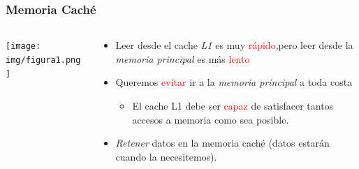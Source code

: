 \documentclass{beamer}
\begin{document}
{
\frametitle{Memoria Caché}
\begin{columns}
	\begin{column}{0.4\textwidth}
		\texttt{[image: img/figura1.png]}
	\end{column}
	\begin{column}{0.6\textwidth}
		\begin{itemize}
			\item<1->Leer desde el cache \emph{L1} es muy \textcolor{red}{rápido},pero leer desde la \emph{memoria principal} es más \textcolor{red}{lento}
			\item<2->Queremos \textcolor{red}{evitar} ir a la \emph{memoria principal} a toda costa
			\begin{itemize}
				\item<3->El cache L1 debe ser \textcolor{red}{capaz} de satisfacer tantos accesos a memoria como sea posible.
			\end{itemize}
			\item<4->\emph{Retener} datos en la memoria caché (datos estarán cuando la necesitemos).
		\end{itemize}
	\end{column}
\end{columns}
}
\end{document}
